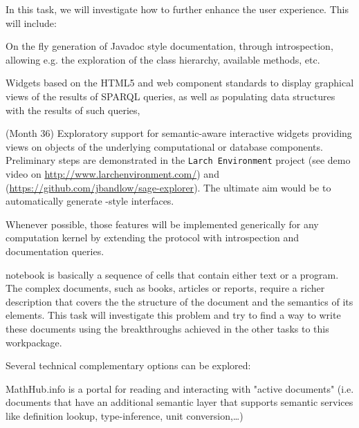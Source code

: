 \begin{workpackage}
\begin{tasklist}
\begin{task}[id=dynamic-inspect,title=Dynamic documentation and exploration system,lead=PS, partners={SR,USO,UV}]
  In this task, we will investigate how to further enhance the user
  experience. This will include:
  \begin{compactitem}
  \item On the fly generation of Javadoc style documentation, through
    introspection, allowing e.g. the exploration of the class
    hierarchy, available methods, etc.
  \item Widgets based on the HTML5 and web component standards to display
    graphical views of the results of SPARQL queries, as well as populating data
    structures with the results of such queries,
  \item {} (Month 36)
    Exploratory support for semantic-aware interactive widgets
    providing views on objects of the underlying computational or
    database components. Preliminary steps are demonstrated in the
    \texttt{Larch Environment} project (see demo video on
    \url{http://www.larchenvironment.com/}) and
    (\url{https://github.com/jbandlow/sage-explorer}). The ultimate
    aim would be to automatically generate \LMFDB-style interfaces.
  \end{compactitem}
  Whenever possible, those features will be implemented generically
  for any computation kernel by extending the \Jupyter protocol with
  introspection and documentation queries.
\end{task}

\begin{task}[title=Structured documents,id=structdocs,lead=JU,PM=24,lead=JU,partners={SR,USH}]

  \Jupyter notebook is basically a sequence of cells that contain either text or
  a program. The complex documents, such as books, articles or reports, require
  a richer description that covers the the structure of the document and the
  semantics of its elements. This task will investigate this problem and try to
  find a way to write these documents using the breakthroughs achieved in the
  other tasks to this workpackage.

  Several technical complementary options can be explored:
  \begin{compactitem}

  \item  MathHub.info is a portal for reading and interacting with
    "active documents" (i.e. documents that have an additional semantic
    layer that supports semantic services like definition lookup,
    type-inference, unit conversion,\ldots)


\end{compactitem}
\end{task}
\end{tasklist}
\end{workpackage}
